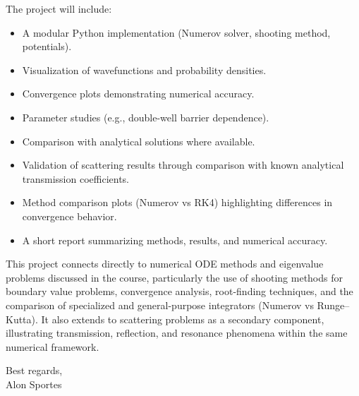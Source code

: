 \documentclass[11pt]{article}
\begin{document}
The project will include:
\begin{itemize}
    \item A modular Python implementation (Numerov solver, shooting method, potentials).
    \item Visualization of wavefunctions and probability densities.
    \item Convergence plots demonstrating numerical accuracy.
    \item Parameter studies (e.g., double-well barrier dependence).
    \item Comparison with analytical solutions where available.
    \item Validation of scattering results through comparison with known analytical transmission coefficients.
    \item Method comparison plots (Numerov vs RK4) highlighting differences in convergence behavior.
    \item A short report summarizing methods, results, and numerical accuracy.
\end{itemize}

This project connects directly to numerical ODE methods and eigenvalue problems discussed in the course, particularly the use of shooting methods for boundary value problems, convergence analysis, root-finding techniques, and the comparison of specialized and general-purpose integrators (Numerov vs Runge--Kutta). It also extends to scattering problems as a secondary component, illustrating transmission, reflection, and resonance phenomena within the same numerical framework.

\vspace{0.5cm}

\noindent
Best regards,\\
Alon Sportes
\end{document}
